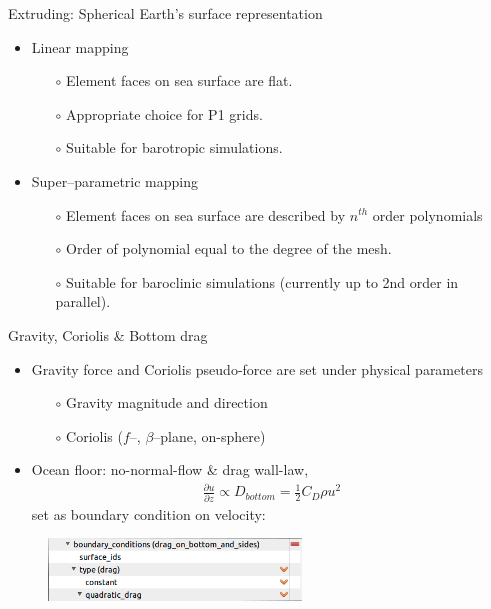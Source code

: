 \documentclass[t]{beamer}
\begin{document}
\begin{frame}{Extruding: Spherical Earth's surface representation}
\begin{itemize}
  \item Linear mapping
  \begin{itemize}
    \item[$\circ$] Element faces on sea surface are flat.
    \item[$\circ$] Appropriate choice for P1 grids.
    \item[$\circ$] Suitable for barotropic simulations.
  \end{itemize}
  \item Super--parametric mapping
  \begin{itemize}
    \item[$\circ$] Element faces on sea surface are described by $n^{th}$ order polynomials
    \item[$\circ$] Order of polynomial equal to the degree of the mesh.
    \item[$\circ$] Suitable for baroclinic simulations (currently up to 2nd order in parallel).
  \end{itemize}
\end{itemize}

\end{frame}

\begin{frame}{Gravity, Coriolis \& Bottom drag}
\begin{itemize}
  \item Gravity force and Coriolis pseudo-force are set under physical parameters
  \begin{itemize}
    \item[$\circ$] Gravity magnitude and direction
    \item[$\circ$] Coriolis ($f$--, $\beta$--plane, on-sphere)
  \end{itemize}
  \item Ocean floor: no-normal-flow \& drag wall-law,
  \begin{align*}
  \frac{\partial u}{\partial z} \propto D_{bottom} = \frac{1}{2} C_D \rho u^{2}
  \end{align*}
  set as boundary condition on velocity:
\end{itemize}
\begin{figure}[htbp!]
 \centering
  \includegraphics[width=0.6\textwidth]{figures/bottom_drag}
\end{figure}
\end{frame}
\end{document}
